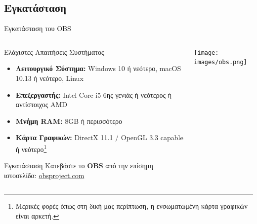 \documentclass[aspectratio=169]{beamer}
\begin{document}
\subsection{Εγκατάσταση}
\begin{frame}{Εγκατάσταση του OBS}
  \begin{columns}
    \begin{column}{0.8\textwidth}
      \begin{block}{Ελάχιστες Απαιτήσεις Συστήματος}
        \begin{itemize}
          \item \textbf{Λειτουργικό Σύστημα:} Windows 10 ή νεότερο, macOS 10.13 ή νεότερο, Linux
          \item \textbf{Επεξεργαστής:} Intel Core i5 6ης γενιάς ή νεότερος ή αντίστοιχος AMD
          \item \textbf{Μνήμη RAM:} 8GB ή περισσότερο
          \item \textbf{Κάρτα Γραφικών:} DirectX 11.1 / OpenGL 3.3 capable ή νεότερο\footnote{Μερικές φορές όπως στη δική μας περίπτωση, η ενσωματωμένη κάρτα γραφικών είναι αρκετή.}
        \end{itemize}
      \end{block}
      \begin{block}{Εγκατάσταση}
        Κατεβάστε το \textbf{OBS} από την επίσημη ιστοσελίδα: \href{https://obsproject.com/}{obsproject.com}
      \end{block}
    \end{column}
    \begin{column}{0.2\textwidth}
      \begin{center}
        \texttt{[image: images/obs.png]}
      \end{center}
    \end{column}
  \end{columns}
\end{frame}
\end{document}
